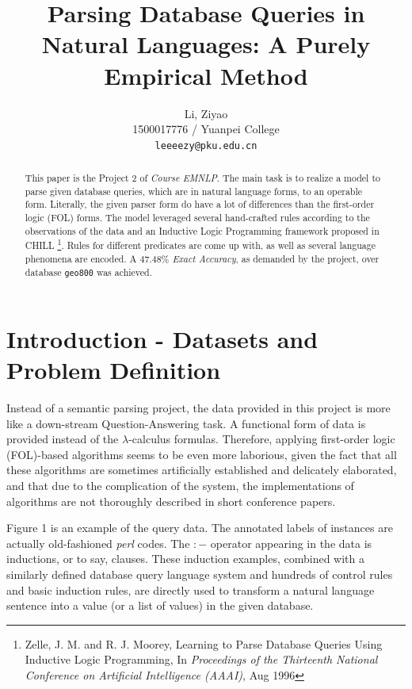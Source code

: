 \documentclass[11pt,a4paper]{article}
\title{Parsing Database Queries in Natural Languages: A Purely Empirical Method}
\author{Li, Ziyao \\
  1500017776 / Yuanpei College \\
  {\tt leeeezy@pku.edu.cn}
  }
\date{}
\begin{document}
\maketitle
\begin{abstract}
  This paper is the Project 2 of \textit{Course EMNLP}. The main task is to realize a model to parse given database queries, which are in natural language forms, to an operable form. Literally, the given parser form do have a lot of differences than the first-order logic (FOL) forms. The model leveraged several hand-crafted rules according to the observations of the data and an Inductive Logic Programming framework proposed in CHILL \footnote{Zelle, J. M. and R. J. Moorey, Learning to Parse Database Queries Using Inductive Logic Programming, In \textit{Proceedings of the Thirteenth National Conference on Artificial Intelligence (AAAI)}, Aug 1996}. Rules for different predicates are come up with, as well as several language phenomena are encoded. A $47.48\%$ \textit{Exact Accuracy}, as demanded by the project, over database \texttt{geo800} was achieved.
\end{abstract}

\section{Introduction - Datasets and Problem Definition}

Instead of a semantic parsing project, the data provided in this project is more like a down-stream Question-Answering task. A functional form of data is provided instead of the $\lambda$-calculus formulas. Therefore, applying first-order logic (FOL)-based algorithms seems to be even more laborious, given the fact that all these algorithms are sometimes artificially established and delicately elaborated, and that due to the complication of the system, the implementations of algorithms are not thoroughly described in short conference papers.

Figure 1 is an example of the query data. The annotated labels of instances are actually old-fashioned \textit{perl} codes. The $:-$ operator appearing in the data is inductions, or to say, clauses.  These induction examples, combined with a similarly defined database query language system and hundreds of control rules and basic induction rules, are directly used to transform a natural language sentence into a value (or a list of values) in the given database.
\end{document}
